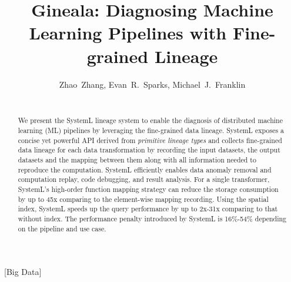 \documentclass{sig-alternate}
\begin{document}
\title{Gineala: Diagnosing Machine Learning Pipelines with Fine-grained Lineage}

\author{
\alignauthor Zhao~Zhang, Evan~R.~Sparks, Michael~J.~Franklin \\\
       \\
}

\maketitle

\begin{abstract}
We present the SystemL lineage system to enable the diagnosis of distributed machine learning (ML) pipelines by leveraging the fine-grained
data lineage.  
SystemL exposes a concise yet powerful API derived from \emph{primitive lineage types} and collects fine-grained data lineage for each 
data transformation by recording the input datasets, the output datasets and the mapping between them along
with all information needed to reproduce the computation.
SystemL efficiently enables data anomaly removal and computation replay, code debugging, and result analysis.
For a single transformer, SystemL's high-order function mapping strategy can reduce the storage consumption by up to 
45x comparing to the element-wise mapping recording.
Using the spatial index, SystemL speeds up the query performance by up to 2x-31x comparing to that without index. 
The performance penalty introduced by SystemL is 16\%-54\% depending on the pipeline and use case.
\end{abstract}

[Big Data]
\end{document}
